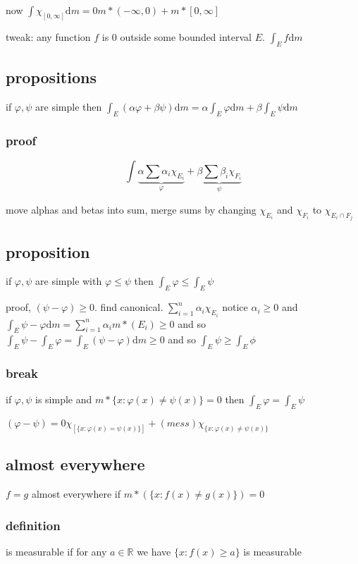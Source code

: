 \documentclass[letterpaper]{article}
\begin{document}
now $\int{\chi_{[0,\infty]}\mathrm{d}m}=0m*(-\infty,0)+m*[0,\infty]$

tweak:
any function $f$ is $0$ outside some bounded interval $E$. $\int_E{f\mathrm{d}m}$

\subsection*{propositions}
if $\varphi,\psi$ are simple then $\int_E{(\alpha\varphi+\beta\psi)\mathrm{d}m}=\alpha\int_E{\varphi\mathrm{d}m}+\beta\int_E{\psi\mathrm{d}m}$

\subsubsection*{proof}
\[\int{\underbrace{\alpha\sum\limits{\alpha_i\chi_{E_i}}}_\varphi+\underbrace{\beta\sum\limits{\beta_i\chi_{F_i}}}_\psi}\]

move alphas and betas into sum, merge sums by changing $\chi_{E_i}$ and $\chi_{F_i}$ to $\chi_{E_i\cap F_j}$

\subsection*{proposition}
if $\varphi, \psi$ 
are simple with $\varphi\le \psi$ then $\int_E\varphi\le \int_E\psi$

proof, $(\psi-\varphi)\ge 0$. find canonical. $\sum\limits_{i=1}^n{\alpha_i\chi_{E_i}}$ notice $\alpha_i\ge 0$ and $\int_E{\psi-\varphi\mathrm{d}m}=\sum\limits_{i=1}^n{\alpha_im*(E_i)}\ge 0$ and so $\int_{E}\psi-\int_E\varphi=\int_E(\psi-\varphi)\mathrm{d}m\ge 0$ and so $\int_E{\psi}\ge\int_E{\phi}$

\subsubsection*{break}
if $\varphi,\psi$ is simple and $m*\{x:\varphi(x)\ne\psi(x)\}=0$ then $\int_E{\varphi}=\int_E\psi$

$(\varphi-\psi)=0\chi_{[\{x:\varphi(x)=\psi(x)\}]}+(mess)\chi_{\{x:\varphi(x)\ne\psi(x)\}}$

\subsection*{almost everywhere}
$f=g$ almost everywhere if $m*(\{x:f(x)\ne g(x)\})=0$

\subsubsection*{definition}
is measurable if for any $a\in \mathbb{R}$ we have $\{x:f(x)\ge a\}$ is measurable
\end{document}
